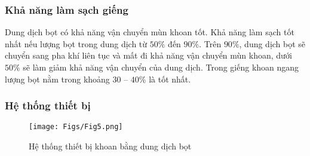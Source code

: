 \documentclass[12pt,a4paper]{article}
\begin{document}
\subsubsection{Khả năng làm sạch giếng}
	Dung dịch bọt có khả năng vận chuyển mùn khoan tốt. Khả năng làm sạch tốt nhất nếu lượng bọt trong dung dịch từ $50\%$ đến $90\%$\cite{rehm2013underbalanced}. Trên $90\%$, dung dịch bọt sẽ chuyển sang pha khí liên tục và mất đi khả năng vận chuyển mùn khoan, dưới $50\%$ sẽ làm giảm khả năng vận chuyển của dung dịch. Trong giếng khoan ngang lượng bọt nằm trong khoảng $30$ – $40\%$ là tốt nhất.
\subsubsection{Hệ thống thiết bị}
	\begin{figure}[h]
	\centering
	\texttt{[image: Figs/Fig5.png]}
	\caption{Hệ thống thiết bị khoan bằng dung dịch bọt\cite{rehm2013underbalanced}}
	\end{figure}
	\newpage
\end{document}
